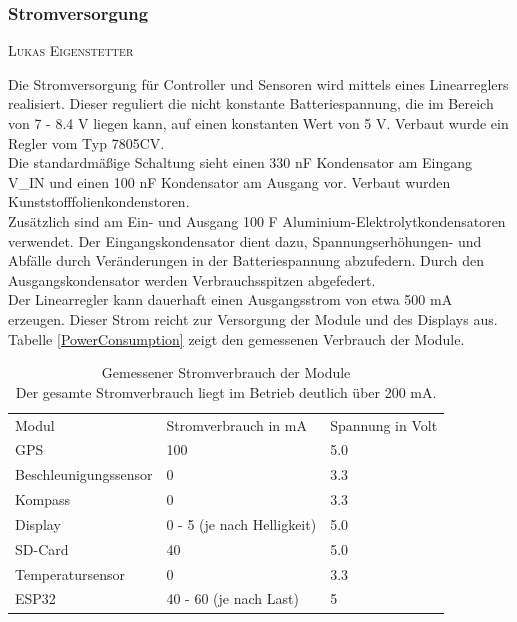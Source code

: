 \documentclass[12pt,a4paper,bibliography=totocnumbered,listof=totocnumbered]{article}
\makeatletter
\newcommand{\chapterauthor}[1]{%
  {\parindent0pt\vspace*{-5pt}%
  \linespread{1.1}\small\scshape#1%
  \par\nobreak\vspace*{3pt}}
  \@afterheading%
}
\makeatother
\begin{document}
\subsubsection{Stromversorgung}
\chapterauthor{Lukas Eigenstetter}
Die Stromversorgung für Controller und Sensoren wird mittels eines Linearreglers realisiert.
Dieser reguliert die nicht konstante Batteriespannung, die im Bereich von 7 - 8.4 V liegen kann, auf einen konstanten Wert von 5 V.
Verbaut wurde ein Regler vom Typ 7805CV.\\
Die standardmäßige Schaltung sieht einen 330 nF Kondensator am Eingang V\_IN und einen 100 nF Kondensator am Ausgang vor. \autocite{linearregler}
Verbaut wurden Kunststofffolienkondenstoren.\\
Zusätzlich sind am Ein- und Ausgang 100 \textmu F Aluminium-Elektrolytkondensatoren verwendet.
Der Eingangskondensator dient dazu, Spannungserhöhungen- und Abfälle durch Veränderungen in der Batteriespannung abzufedern.
Durch den Ausgangskondensator werden Verbrauchsspitzen abgefedert.\\
Der Linearregler kann dauerhaft einen Ausgangsstrom von etwa 500 mA erzeugen.
Dieser Strom reicht zur Versorgung der Module und des Displays aus.\\
Tabelle \autoref{PowerConsumption} zeigt den gemessenen Verbrauch der Module.

\begin{table}[H]
    \begin{center}
        \begin{tabular}{|l|l|l|}
            \hline
            Modul                 & Stromverbrauch in mA       & Spannung in Volt \\
            \Xhline{3\arrayrulewidth}
            GPS                   & 100                        & 5.0              \\
            \hline
            Beschleunigungssensor & 0                          & 3.3              \\
            \hline
            Kompass               & 0                          & 3.3              \\
            \hline
            Display               & 0 - 5 (je nach Helligkeit) & 5.0              \\
            \hline
            SD-Card               & 40                         & 5.0              \\
            \hline
            Temperatursensor      & 0                          & 3.3              \\
            \hline
            ESP32                 & 40 - 60 (je nach Last)     & 5                \\
            \hline
        \end{tabular}
        \caption{Gemessener Stromverbrauch der Module\\
            Der gesamte Stromverbrauch liegt im Betrieb deutlich über 200 mA.}
        \label{PowerConsumption}
    \end{center}
\end{table}
\end{document}

